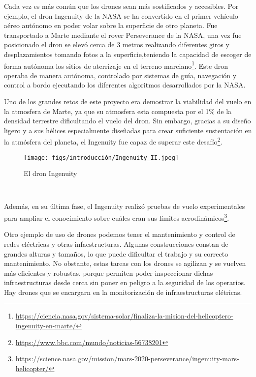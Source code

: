 Cada vez es más común que los drones sean más sostificados y accesibles. Por ejemplo, el dron Ingenuity de la NASA se ha convertido en el primer vehículo aéreo autónomo en poder volar
sobre la superficie de otro planeta. Fue transportado a Marte mediante el rover Perseverance de la NASA, una vez fue posicionado el dron se elevó cerca de 3 metros realizando 
diferentes giros y desplazamientos tomando fotos a la superficie,teniendo la capacidad de escoger de forma autónoma los sitios de aterrizaje en el terreno marciano\footnote{\url{https://ciencia.nasa.gov/sistema-solar/finaliza-la-mision-del-helicoptero-ingenuity-en-marte/}}.
Este dron operaba de manera autónoma, controlado por sistemas de guía, navegación y control a bordo ejecutando los diferentes algoritmos desarrollados por la NASA. \newline

Uno de los grandes retos de este proyecto era demostrar la viabilidad del vuelo en la atmosfera de Marte, ya que su atmosfera esta compuesta por el 1\% de la densidad terrestre
dificultando el vuelo del dron. Sin embargo, gracias a su diseño ligero y a sus hélices especialmente diseñadas para crear suficiente sustentación en la atmósfera del planeta, el Ingenuity 
fue capaz de superar este desafío\footnote{\url{https://www.bbc.com/mundo/noticias-56738201}}. \newline
\begin{figure} [H]
  \begin{center}
    \texttt{[image: figs/introducción/Ingenuity\_II.jpeg]}
  \end{center}
  \caption{El dron Ingenuity}
  \label{fig:Ingenuity}
\end{figure}\

Además, en su última fase, el Ingenuity realizó pruebas de vuelo experimentales para ampliar el conocimiento sobre cuáles eran sus límites aerodinámicos\footnote{\url{https://science.nasa.gov/mission/mars-2020-perseverance/ingenuity-mars-helicopter/}}.\newline

Otro ejemplo de uso de drones podemos tener el mantenimiento y control de redes eléctricas y otras infaestructuras. Algunas construcciones constan de grandes alturas y tamaños, lo que puede
dificultar el trabajo y su correcto mantenimiento. No obstante, estas tareas con los drones se agilizan y se vuelven más eficientes y robustas, porque permiten poder
inspeccionar dichas infraestructuras desde cerca sin poner en peligro a la seguridad de los operarios. 
Hay drones que se encargarn en la monitorización de infraestructuras elétricas. \newline

